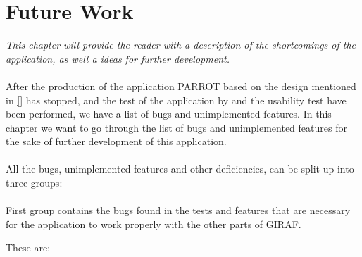 \chapter{Future Work}

\textit{This chapter will provide the reader with a description of the shortcomings of the application, as well a ideas for further development. }\\
\\
After the production of the application PARROT based on the design mentioned in \autoref{} has stopped, and the test of the application by and the usability test have been performed, we have a list of bugs and unimplemented features.\newline
In this chapter we want to go through the list of bugs and unimplemented features for the sake of further development of this application.\\
\\
All the bugs, unimplemented features and other deficiencies, can be split up into three groups:\\
\\
First group contains the bugs found in the tests and features that are necessary for the application to work properly with the other parts of GIRAF.\newline 

These are:

